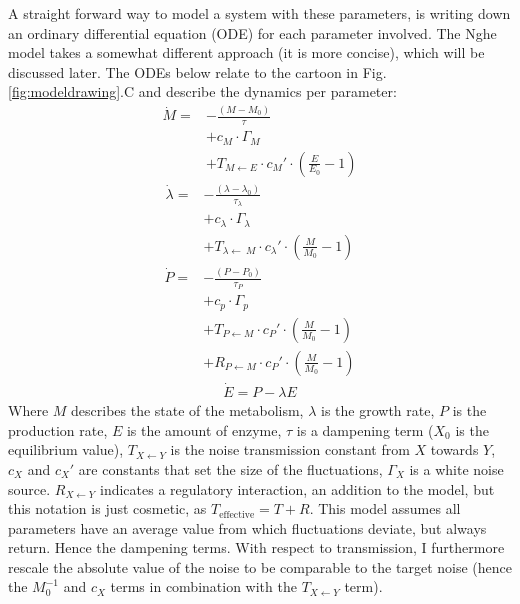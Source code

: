 A straight forward way to model a system with these parameters, is writing down an ordinary differential equation (ODE) for each parameter involved. 
%
The Nghe model takes a somewhat different approach (it is more concise), which will be discussed later.
%
The ODEs below relate to the cartoon in Fig. \ref{fig:modeldrawing}.C
and describe the dynamics per parameter:
%
\begin{align}
\label{myfirstequation}
\dot{M} = & - \frac{(M-M_0)}{\tau}  \nonumber \\ 
          & + c_M \cdot \Gamma_M  \nonumber \\ %
          & + T_{M\leftarrow E} \cdot c_M' \cdot (\frac{E}{E_0} - 1)  
\end{align}
%
%
\begin{align}
	\dot{\lambda} = & -\frac{(\lambda - \lambda_0 )}{\tau_\lambda} \nonumber \\ 
 			& + c_\lambda \cdot \Gamma_\lambda \nonumber \\  %
			& + T_{\lambda\leftarrow\ M} \cdot c_\lambda' \cdot (\frac{M}{M_0}-1) 
\end{align}
%
\begin{align}
\label{mythirdequation}
\dot{P} = & - \frac{(P-P_0)}{\tau_P} \nonumber \\ 
		 & + c_p \cdot \Gamma_p \nonumber \\ 
         & + T_{P\leftarrow M} \cdot c_P' \cdot (\frac{M}{M_0}-1)  \nonumber \\ 
         & + R_{P\leftarrow M} \cdot c_P' \cdot (\frac{M}{M_0}-1)
\end{align}
%
\begin{align}
\label{mylastequation}
\dot{E} = P - \lambda E
\end{align}
%
Where $M$ describes the state of the metabolism, $\lambda$ is the growth rate, $P$ is the production rate, $E$ is the amount of enzyme, $\tau$ is a dampening term ($X_0$ is the equilibrium value), $T_{X \leftarrow Y}$ is the noise transmission constant from $X$ towards $Y$, $c_X$ and $c_X'$ are constants that set the size of the fluctuations, $\Gamma_X$ is a white noise source.
$R_{X \leftarrow Y}$ indicates a regulatory interaction, an addition to the model, but this notation is just cosmetic, as $T_\text{effective}=T+R$.
%
This model assumes all parameters have an average value from which fluctuations deviate, but always return. Hence the dampening terms.
With respect to transmission, I furthermore rescale the absolute value of the noise to be comparable to the target noise (hence the $M_0^{-1}$ and $c_X$ terms in combination with the $T_{X\leftarrow Y}$ term).

